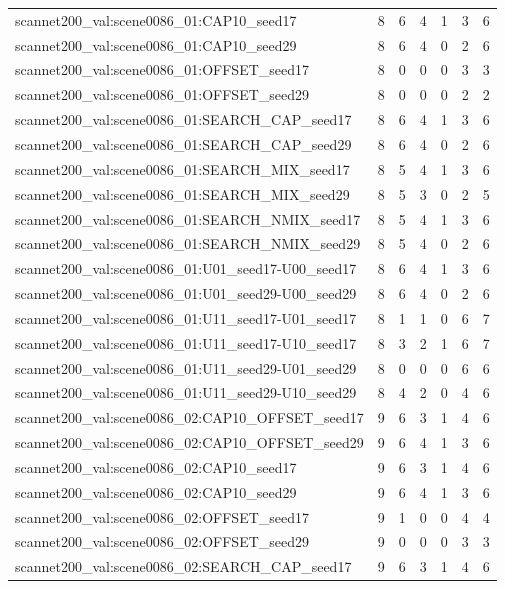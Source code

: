 \begin{table}[t]
\begin{tabular}{lrrrrrr}
scannet200\_val:scene0086\_01:CAP10\_seed17 & 8 & 6 & 4 & 1 & 3 & 6 \\
scannet200\_val:scene0086\_01:CAP10\_seed29 & 8 & 6 & 4 & 0 & 2 & 6 \\
scannet200\_val:scene0086\_01:OFFSET\_seed17 & 8 & 0 & 0 & 0 & 3 & 3 \\
scannet200\_val:scene0086\_01:OFFSET\_seed29 & 8 & 0 & 0 & 0 & 2 & 2 \\
scannet200\_val:scene0086\_01:SEARCH\_CAP\_seed17 & 8 & 6 & 4 & 1 & 3 & 6 \\
scannet200\_val:scene0086\_01:SEARCH\_CAP\_seed29 & 8 & 6 & 4 & 0 & 2 & 6 \\
scannet200\_val:scene0086\_01:SEARCH\_MIX\_seed17 & 8 & 5 & 4 & 1 & 3 & 6 \\
scannet200\_val:scene0086\_01:SEARCH\_MIX\_seed29 & 8 & 5 & 3 & 0 & 2 & 5 \\
scannet200\_val:scene0086\_01:SEARCH\_NMIX\_seed17 & 8 & 5 & 4 & 1 & 3 & 6 \\
scannet200\_val:scene0086\_01:SEARCH\_NMIX\_seed29 & 8 & 5 & 4 & 0 & 2 & 6 \\
scannet200\_val:scene0086\_01:U01\_seed17-U00\_seed17 & 8 & 6 & 4 & 1 & 3 & 6 \\
scannet200\_val:scene0086\_01:U01\_seed29-U00\_seed29 & 8 & 6 & 4 & 0 & 2 & 6 \\
scannet200\_val:scene0086\_01:U11\_seed17-U01\_seed17 & 8 & 1 & 1 & 0 & 6 & 7 \\
scannet200\_val:scene0086\_01:U11\_seed17-U10\_seed17 & 8 & 3 & 2 & 1 & 6 & 7 \\
scannet200\_val:scene0086\_01:U11\_seed29-U01\_seed29 & 8 & 0 & 0 & 0 & 6 & 6 \\
scannet200\_val:scene0086\_01:U11\_seed29-U10\_seed29 & 8 & 4 & 2 & 0 & 4 & 6 \\
scannet200\_val:scene0086\_02:CAP10\_OFFSET\_seed17 & 9 & 6 & 3 & 1 & 4 & 6 \\
scannet200\_val:scene0086\_02:CAP10\_OFFSET\_seed29 & 9 & 6 & 4 & 1 & 3 & 6 \\
scannet200\_val:scene0086\_02:CAP10\_seed17 & 9 & 6 & 3 & 1 & 4 & 6 \\
scannet200\_val:scene0086\_02:CAP10\_seed29 & 9 & 6 & 4 & 1 & 3 & 6 \\
scannet200\_val:scene0086\_02:OFFSET\_seed17 & 9 & 1 & 0 & 0 & 4 & 4 \\
scannet200\_val:scene0086\_02:OFFSET\_seed29 & 9 & 0 & 0 & 0 & 3 & 3 \\
scannet200\_val:scene0086\_02:SEARCH\_CAP\_seed17 & 9 & 6 & 3 & 1 & 4 & 6 \\

\end{tabular}
\end{table}
